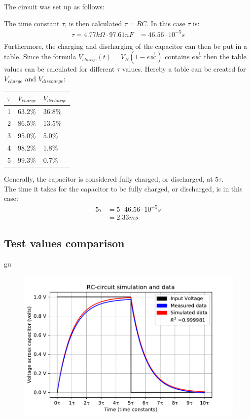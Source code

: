 The circuit was set up as follows:
\begin{figure}[H]
	
\end{figure}
The time constant $\tau$, is then calculated $\tau = RC$. In this case $\tau$ is:
\begin{align*}
	\tau = 4.77 k\Omega \cdot 97.61 nF &= 46.56 \cdot 10^{-5} s \\
\end{align*}
Furthermore, the charging and discharging of the capacitor can then be put in a table. Since the formula $V_{charge}(t)=V_B(1-e^{\frac{-t}{RC}})$ contains $e^{\frac{-t}{RC}}$ then the table values can be calculated for different $\tau$ values. Hereby a table can be created for $V_{charge}$ and $V_{discharge}$:
\begin{table}[H]
\center
\begin{tabular}{|l|l|l|}
\hline
$\tau$ & $V_{charge}$ & $V_{decharge}$ \\ \hline
1      & 63.2\%       & 36.8\%         \\ \hline
2      & 86.5\%       & 13.5\%         \\ \hline
3      & 95.0\%       & 5.0\%          \\ \hline
4      & 98.2\%       & 1.8\%          \\ \hline
5      & 99.3\%       & 0.7\%          \\ \hline
\end{tabular}
\end{table}
Generally, the capacitor is considered fully charged, or discharged, at $5\tau$. \\
The time it takes for the capacitor to be fully charged, or discharged, is in this case:
\begin{align*}
5\tau &= 5 \cdot 46.56 \cdot 10^{-5} s \\
&= 2.33 ms
\end{align*}
\subsection{Test values comparison}
gu

\begin{figure}
\center
\includegraphics[scale=1]{fig/img/eks_1}
\end{figure}

